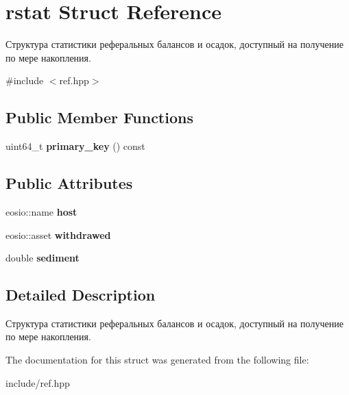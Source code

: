 \hypertarget{structrstat}{}\section{rstat Struct Reference}
\label{structrstat}


Структура статистики реферальных балансов и осадок, доступный на получение по мере накопления.  




{\ttfamily \#include $<$ref.\+hpp$>$}

\subsection*{Public Member Functions}
\begin{DoxyCompactItemize}
\item 
\mbox{\label{structrstat_af94b16bcf555b0016b8a0f6c25505031}} 
uint64\+\_\+t {\bfseries primary\+\_\+key} () const
\end{DoxyCompactItemize}
\subsection*{Public Attributes}
\begin{DoxyCompactItemize}
\item 
\mbox{\label{structrstat_ad16be0649bc5fc500887b1599c8897df}} 
eosio\+::name {\bfseries host}
\item 
\mbox{\label{structrstat_ae1099534688656a0f758093c41fc7e52}} 
eosio\+::asset {\bfseries withdrawed}
\item 
\mbox{\label{structrstat_a29f284b73dc1a003686498e32f2730b7}} 
double {\bfseries sediment}
\end{DoxyCompactItemize}


\subsection{Detailed Description}
Структура статистики реферальных балансов и осадок, доступный на получение по мере накопления. 

The documentation for this struct was generated from the following file\+:\begin{DoxyCompactItemize}
\item 
include/ref.\+hpp\end{DoxyCompactItemize}
